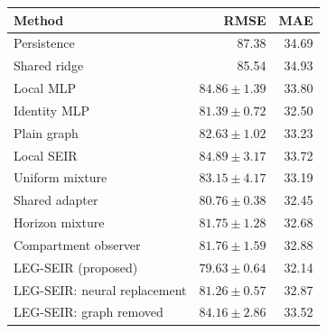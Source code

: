 \begin{tabular}{lrr}\toprule Method & RMSE & MAE\\\midrule
Persistence & 87.38 & 34.69\\
Shared ridge & 85.54 & 34.93\\
Local MLP & $84.86\pm1.39$ & 33.80\\
Identity MLP & $81.39\pm0.72$ & 32.50\\
Plain graph & $82.63\pm1.02$ & 33.23\\
Local SEIR & $84.89\pm3.17$ & 33.72\\
Uniform mixture & $83.15\pm4.17$ & 33.19\\
Shared adapter & $80.76\pm0.38$ & 32.45\\
Horizon mixture & $81.75\pm1.28$ & 32.68\\
Compartment observer & $81.76\pm1.59$ & 32.88\\
LEG-SEIR (proposed) & $79.63\pm0.64$ & 32.14\\
LEG-SEIR: neural replacement & $81.26\pm0.57$ & 32.87\\
LEG-SEIR: graph removed & $84.16\pm2.86$ & 33.52\\
\bottomrule\end{tabular}